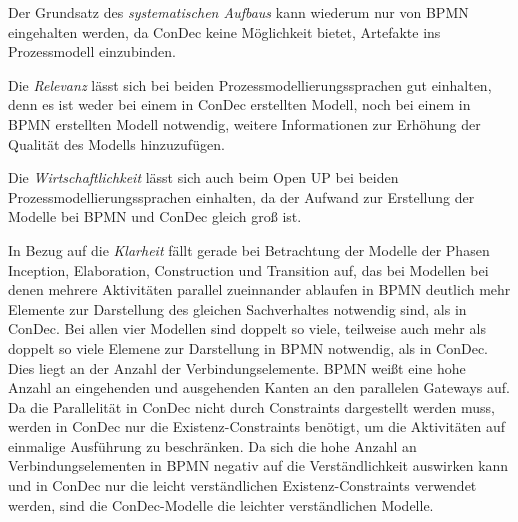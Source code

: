 Der Grundsatz des \textit{systematischen Aufbaus} kann wiederum nur von BPMN eingehalten werden, da ConDec keine Möglichkeit bietet, Artefakte ins Prozessmodell einzubinden.\newline

Die \textit{Relevanz} lässt sich bei beiden Prozessmodellierungssprachen gut einhalten, denn es ist weder bei einem in ConDec erstellten Modell, noch bei einem in BPMN erstellten Modell notwendig, weitere Informationen zur Erhöhung der Qualität des Modells hinzuzufügen.\newline

Die \textit{Wirtschaftlichkeit} lässt sich auch beim Open UP bei beiden Prozessmodellierungssprachen einhalten, da der Aufwand zur Erstellung der Modelle bei BPMN und ConDec gleich groß ist.\newline

In Bezug auf die \textit{Klarheit} fällt gerade bei Betrachtung der Modelle der Phasen Inception, Elaboration, Construction und Transition auf, das bei Modellen bei denen mehrere Aktivitäten parallel zueinnander ablaufen in BPMN deutlich mehr Elemente zur Darstellung des gleichen Sachverhaltes notwendig sind, als in ConDec. Bei allen vier Modellen sind doppelt so viele, teilweise auch mehr als doppelt so viele Elemene zur Darstellung in BPMN notwendig, als in ConDec. Dies liegt an der Anzahl der Verbindungselemente. BPMN weißt eine hohe Anzahl an eingehenden und ausgehenden Kanten an den parallelen Gateways auf. Da die Parallelität in ConDec nicht durch Constraints dargestellt werden muss, werden in ConDec nur die Existenz-Constraints benötigt, um die Aktivitäten auf einmalige Ausführung zu beschränken. Da sich die hohe Anzahl an Verbindungselementen in BPMN negativ auf die Verständlichkeit auswirken kann und in ConDec nur die leicht verständlichen Existenz-Constraints verwendet werden, sind die ConDec-Modelle die leichter verständlichen Modelle. \newline

